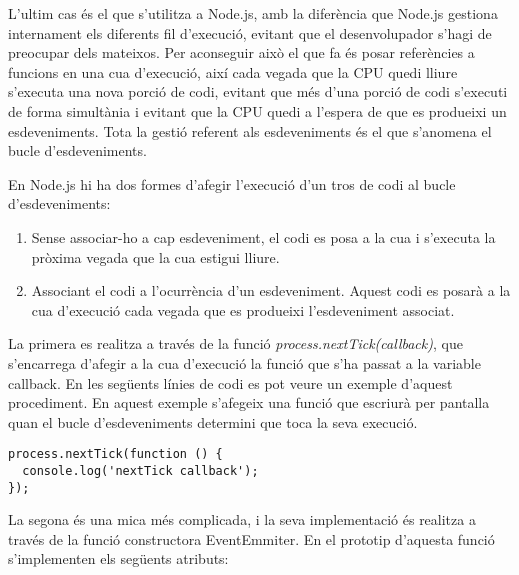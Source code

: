 L'ultim cas és el que s'utilitza a Node.js, amb la diferència que Node.js gestiona internament els diferents fil d'execució, evitant que el desenvolupador s'hagi de preocupar dels mateixos. Per aconseguir això el que fa és posar referències a funcions en una cua d'execució, així cada vegada que la CPU quedi lliure s'executa una nova porció de codi, evitant que més d'una porció de codi s'executi de forma simultània i evitant que la CPU quedi a l'espera de que es produeixi un esdeveniments. Tota la gestió referent als esdeveniments és el que s'anomena el bucle d'esdeveniments. 

En Node.js hi ha dos formes d'afegir l'execució d'un tros de codi al bucle d'esdeveniments: 

\begin{enumerate}
    \item{Sense associar-ho a cap esdeveniment, el codi es posa a la cua i s'executa la pròxima vegada que la cua estigui lliure.}
    \item{Associant el codi a l'ocurrència d'un esdeveniment. Aquest codi es posarà a la cua d'execució cada vegada que es produeixi l'esdeveniment associat.}
\end{enumerate}

La primera es realitza a través de la funció \emph{process.nextTick(callback)}, que s'encarrega d'afegir a la cua d'execució la funció que s'ha passat a la variable callback. En les següents línies de codi es pot veure un exemple d'aquest procediment. En aquest exemple s'afegeix una funció que escriurà per pantalla quan el bucle d'esdeveniments determini que toca la seva execució.

\begin{lstlisting}
process.nextTick(function () {
  console.log('nextTick callback');
});
\end{lstlisting}

La segona és una mica més complicada, i la seva implementació és realitza a través de la funció constructora EventEmmiter. En el prototip d'aquesta funció s'implementen els següents atributs: 

